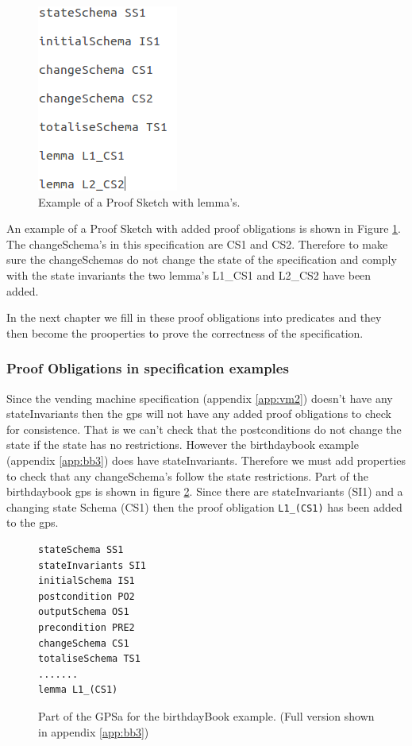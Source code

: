 \begin{figure}[H]
\centering
\includegraphics[scale=0.5]{Figures/skeleton/proofskeletonwithpo.png}
\caption{Example of a Proof Sketch with lemma's.}
\label{fig:gpswithpo}
\end{figure}

An example of a Proof Sketch with added proof obligations is shown in
Figure \ref{fig:gpswithpo}. The changeSchema's in this specification are CS1 and
CS2. Therefore to make sure the changeSchemas do not change the state of the
specification and comply with the state invariants the two lemma's L1\_CS1 and
L2\_CS2 have been added.

In the next chapter we fill in these proof obligations into predicates and they 
then become the prooperties to prove the correctness of the specification.

\subsubsection{Proof Obligations in specification examples}
Since the vending machine specification (appendix \ref{app:vm2}) doesn't have
any stateInvariants then the \gls{gps} will not have any added proof
obligations to check for consistence. That is we can't check that the
postconditions do not change the state if the state has no restrictions. However
the birthdaybook example (appendix \ref{app:bb3}) does have stateInvariants.
Therefore we must add properties to check that any changeSchema's follow the
state restrictions. Part of the birthdaybook \gls{gps} is shown in figure
\ref{fig:bbgps}. Since there are stateInvariants (SI1) and a changing state
Schema (CS1) then the proof obligation \texttt{L1\_(CS1)} has been added to the
\gls{gps}.

\begin{figure}[H]
\begin{verbatim}
stateSchema SS1 
stateInvariants SI1 
initialSchema IS1 
postcondition PO2 
outputSchema OS1 
precondition PRE2 
changeSchema CS1 
totaliseSchema TS1 
.......
lemma L1_(CS1) 
\end{verbatim}
\caption{Part of the GPSa for the birthdayBook example. (Full version shown in appendix \ref{app:bb3}) \label{fig:bbgps}}
\end{figure}

